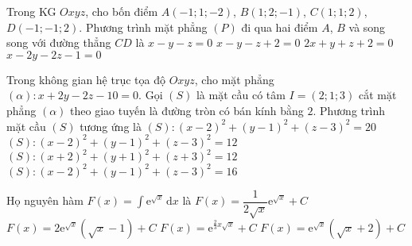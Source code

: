 \begin{ex}%
Trong KG $Oxyz$, cho bốn điểm $A(-1;1;-2)$, $B(1;2;-1)$, $C(1;1;2)$, $D(-1;-1;2)$. Phương trình mặt phẳng $(P)$ đi qua hai điểm $A$, $B$ và song song với đường thẳng $CD$ là
\choice
{\True $x-y-z=0$}
{$x-y-z+2=0$}
{$2x+y+z+2=0$}
{$x-2y-2z-1=0$}
\end{ex}

\begin{ex}%
Trong không gian hệ trục tọa độ $O x y z$, cho mặt phẳng $(\alpha): x+2 y-2 z-10=0$. Gọi $(S)$ là mặt cầu có tâm $I=(2 ; 1 ; 3)$ cắt mặt phẳng $(\alpha)$ theo giao tuyến là đường tròn có bán kính bằng $2$. Phương trình mặt cầu $(S)$ tương ứng là
\choice
{\True$(S):(x-2)^{2}+(y-1)^{2}+(z-3)^{2}=20$}
{$(S):(x-2)^{2}+(y-1)^{2}+(z-3)^{2}=12$}
{$(S):(x+2)^{2}+(y+1)^{2}+(z+3)^{2}=12$}
{$(S):(x-2)^{2}+(y-1)^{2}+(z-3)^{2}=16$}
\end{ex}

\begin{ex}%
Họ nguyên hàm $F(x)=\displaystyle\int\mathrm{e}^{\sqrt{x}}\mathrm{\,d}x$ là
\choice
{$F(x)=\dfrac{1}{2\sqrt{x}}\mathrm{e}^{\sqrt{x}}+C$}
{\True $F(x)=2\mathrm{e}^{\sqrt{x}}\left(\sqrt{x}-1\right)+C$}
{$F(x)=\mathrm{e}^{\tfrac{2}{3}x\sqrt{x}}+C$}
{$F(x)=\mathrm{e}^{\sqrt{x}}\left(\sqrt{x}+2\right)+C$}
\end{ex}


